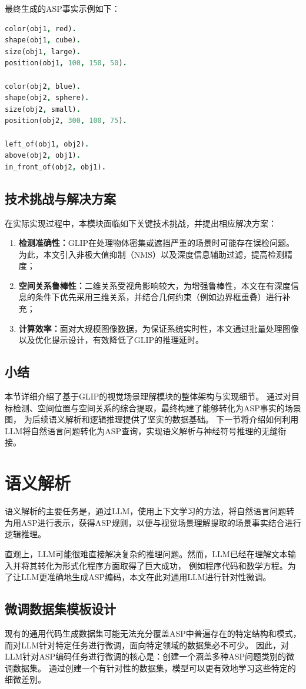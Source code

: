 最终生成的ASP事实示例如下： 
\begin{lstlisting}[language=Prolog] 
color(obj1, red). 
shape(obj1, cube). 
size(obj1, large). 
position(obj1, 100, 150, 50).

color(obj2, blue). 
shape(obj2, sphere). 
size(obj2, small). 
position(obj2, 300, 100, 75).

left_of(obj1, obj2). 
above(obj2, obj1). 
in_front_of(obj2, obj1). 
\end{lstlisting}
\subsection{技术挑战与解决方案}
在实际实现过程中，本模块面临如下关键技术挑战，并提出相应解决方案： 
\begin{enumerate}[label=(\arabic*),itemsep=0.5em] 
    \item \textbf{检测准确性：}GLIP在处理物体密集或遮挡严重的场景时可能存在误检问题。为此，本文引入非极大值抑制（NMS）以及深度信息辅助过滤，提高检测精度； 
    \item \textbf{空间关系鲁棒性：}二维关系受视角影响较大，为增强鲁棒性，本文在有深度信息的条件下优先采用三维关系，并结合几何约束（例如边界框重叠）进行补充； 
    \item \textbf{计算效率：}面对大规模图像数据，为保证系统实时性，本文通过批量处理图像以及优化提示设计，有效降低了GLIP的推理延时。
\end{enumerate}
\subsection{小结}
本节详细介绍了基于GLIP的视觉场景理解模块的整体架构与实现细节。
通过对目标检测、空间位置与空间关系的综合提取，最终构建了能够转化为ASP事实的场景图，
为后续语义解析和逻辑推理提供了坚实的数据基础。
下一节将介绍如何利用LLM将自然语言问题转化为ASP查询，实现语义解析与神经符号推理的无缝衔接。
\section{语义解析}
语义解析的主要任务是，通过LLM，使用上下文学习的方法，将自然语言问题转为用ASP进行表示，获得ASP规则，以便与视觉场景理解提取的场景事实结合进行逻辑推理。

直观上，LLM可能很难直接解决复杂的推理问题。然而，LLM已经在理解文本输入并将其转化为形式化程序方面取得了巨大成功，
例如程序代码\cite{gao2023pal}和数学方程\cite{he2023solving}。为了让LLM更准确地生成ASP编码，本文在此对通用LLM进行针对性微调。
\subsection{微调数据集模板设计}
现有的通用代码生成数据集可能无法充分覆盖ASP中普遍存在的特定结构和模式，而对LLM针对特定任务进行微调，面向特定领域的数据集必不可少。
因此，对LLM针对ASP编码任务进行微调的核心是：创建一个涵盖多种ASP问题类别的微调数据集。
通过创建一个有针对性的数据集，模型可以更有效地学习这些特定的细微差别。

